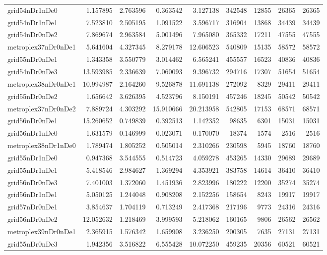 \begin{longtable}{|l|r|r|r|r|r|r|r|r|}
grid54nDr1nDe0 & 1.157895 & 2.763596 & 0.363542 & 3.127138 & 342548 & 12855 & 26365 & 26365 \\
grid54nDr1nDe1 & 7.523810 & 2.505195 & 1.091522 & 3.596717 & 316904 & 13868 & 34439 & 34439 \\
grid54nDr0nDe2 & 7.869674 & 2.963584 & 5.001496 & 7.965080 & 365332 & 17211 & 47555 & 47555 \\
metroplex37nDr0nDe1 & 5.641604 & 4.327345 & 8.279178 & 12.606523 & 540809 & 15135 & 58572 & 58572 \\
grid55nDr0nDe1 & 1.343358 & 3.550779 & 3.014462 & 6.565241 & 455557 & 16523 & 40836 & 40836 \\
grid54nDr0nDe3 & 13.593985 & 2.336639 & 7.060093 & 9.396732 & 294716 & 17307 & 51654 & 51654 \\
metroplex38nDr0nDe1 & 10.994987 & 2.164260 & 9.526878 & 11.691138 & 272092 & 8329 & 29411 & 29411 \\
grid55nDr0nDe2 & 1.656642 & 3.626395 & 4.523796 & 8.150191 & 457246 & 18245 & 50542 & 50542 \\
metroplex37nDr0nDe2 & 7.889724 & 4.303292 & 15.910666 & 20.213958 & 542805 & 17153 & 68571 & 68571 \\
grid56nDr0nDe1 & 15.260652 & 0.749839 & 0.392513 & 1.142352 & 98635 & 6301 & 15031 & 15031 \\
grid56nDr1nDe0 & 1.631579 & 0.146999 & 0.023071 & 0.170070 & 18374 & 1574 & 2516 & 2516 \\
metroplex38nDr1nDe0 & 1.789474 & 1.805252 & 0.505014 & 2.310266 & 230598 & 5945 & 18760 & 18760 \\
grid55nDr1nDe0 & 0.947368 & 3.544555 & 0.514723 & 4.059278 & 453265 & 14330 & 29689 & 29689 \\
grid55nDr1nDe1 & 5.418546 & 2.984627 & 1.369294 & 4.353921 & 383758 & 14614 & 36410 & 36410 \\
grid56nDr0nDe3 & 7.401003 & 1.372060 & 1.451936 & 2.823996 & 180222 & 12200 & 35274 & 35274 \\
grid56nDr1nDe1 & 5.050125 & 1.244048 & 0.908208 & 2.152256 & 158654 & 8243 & 19917 & 19917 \\
grid57nDr0nDe1 & 3.854637 & 1.704119 & 0.713249 & 2.417368 & 217196 & 9773 & 24316 & 24316 \\
grid56nDr0nDe2 & 12.052632 & 1.218469 & 3.999593 & 5.218062 & 160165 & 9806 & 26562 & 26562 \\
metroplex39nDr0nDe1 & 2.365915 & 1.576342 & 1.659908 & 3.236250 & 200305 & 7635 & 27131 & 27131 \\
grid55nDr0nDe3 & 1.942356 & 3.516822 & 6.555428 & 10.072250 & 459235 & 20356 & 60521 & 60521 \\

\end{longtable}
